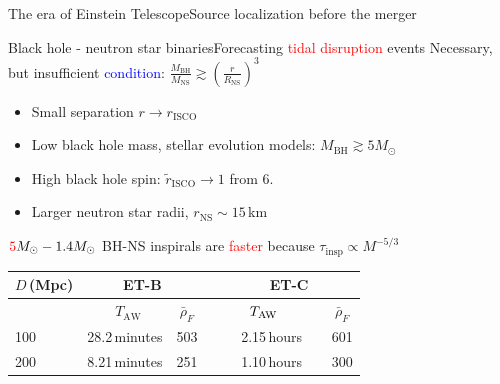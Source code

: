 \documentclass[xcolor=dvipsnames,handout,t]{beamer}
\newcommand{\red}[1]{\textcolor{red}{#1}}
\newcommand{\bl}[1]{\textcolor{blue}{#1}}
\newcommand{\f}{\frac}
\newcommand\T{\rule{0pt}{2.6ex}}       %
\newcommand\B{\rule[-1.2ex]{0pt}{0pt}} %
\begin{document}
\begin{frame}{The era of Einstein Telescope}{Source localization before the merger}
\end{frame}


\begin{frame}{Black hole - neutron star binaries}{Forecasting \red{tidal disruption} events}
  Necessary, but insufficient \bl{condition}:
  $   \f{M_\text{BH}}{M_\text{NS}} \gtrsim \left(\f{r}{R_\text{NS}}\right)^3  $
  \begin{itemize}
  \item Small separation $r\to r_\text{ISCO}$
  \item Low black hole mass, stellar evolution models: $M_\text{BH}\gtrsim 5M_\odot$
  \item High black hole spin: $\tilde{r}_\text{ISCO}\to 1$ from 6.
  \item Larger neutron star radii, $r_\text{NS}\sim15\,$km
  \end{itemize}
  $\red{5} M_\odot -1.4 M_\odot$ BH-NS inspirals are \red{faster} because $\tau_\text{insp} \propto M^{-5/3}$
  \begin{footnotesize}
  \begin{table}[h]
  \centering
  \begin{tabular}{lccccc}
  \hline\hline
  $D\,$(Mpc) & \multicolumn{2}{c}{ET-B} &  & \multicolumn{2}{c}{ET-C}\T\B\\
  \hline
  {}&  \ \hspace{6mm}$T_\text{AW}$ \hspace{8mm} & $\bar{\rho}_{F}$ &{}  & $\hspace{6mm}T_\text{AW} \hspace{10mm}$ & $\bar{\rho}_{F}$\T\B\\
  100 &   28.2\,minutes & 503 &{\qquad} &  2.15\,hours & 601\T\\
  200 & 8.21\,minutes & 251  &{\qquad} & 1.10\,hours & 300 \\

\end{tabular}
\end{table}
\end{footnotesize}
\end{frame}
\end{document}
